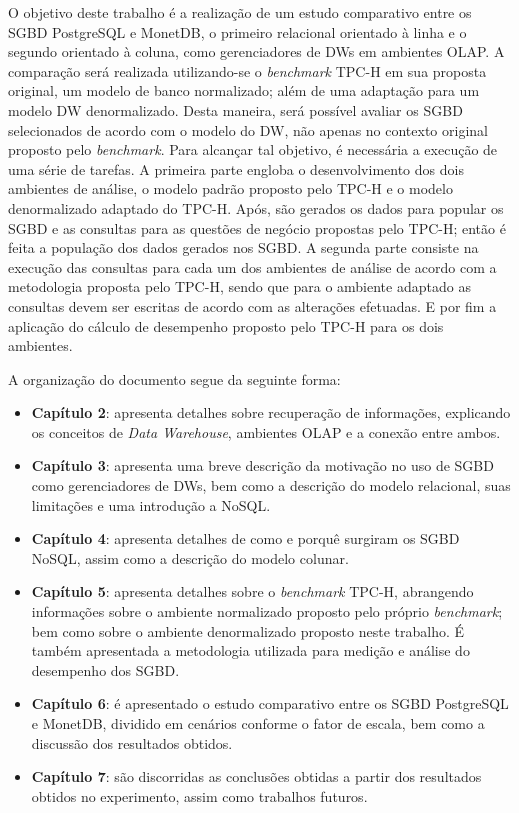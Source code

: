 O objetivo deste trabalho é a realização de um estudo comparativo entre os SGBD PostgreSQL e MonetDB, o primeiro relacional orientado à linha e o segundo orientado à coluna, 
como gerenciadores de DWs em ambientes OLAP. A comparação será realizada utilizando-se o \textit{benchmark} TPC-H em sua proposta original, um modelo de banco normalizado; 
além de uma adaptação para um modelo DW denormalizado. Desta maneira, será possível avaliar os SGBD selecionados de acordo com o modelo do DW, não apenas no 
contexto original proposto pelo \textit{benchmark}. Para alcançar tal objetivo, é necessária a execução de uma série de tarefas. A primeira parte engloba o 
desenvolvimento dos dois ambientes de análise, o modelo padrão proposto pelo TPC-H e o modelo denormalizado adaptado do TPC-H. Após, são gerados os 
dados para popular os SGBD e as consultas para as questões de negócio propostas pelo TPC-H; então é feita a população dos dados gerados nos SGBD. 
A segunda parte consiste na execução das consultas para cada um dos ambientes de análise de acordo com a metodologia proposta pelo TPC-H, sendo que para o ambiente adaptado as consultas devem 
ser escritas de acordo com as alterações efetuadas. E por fim a aplicação do cálculo de desempenho proposto pelo TPC-H para os dois ambientes. 

A organização do documento segue da seguinte forma:

\begin{itemize}
	\item \textbf{Capítulo 2}: apresenta detalhes sobre recuperação de informações, explicando os conceitos de \textit{Data Warehouse}, 
	ambientes OLAP e a conexão entre ambos.
	\item \textbf{Capítulo 3}: apresenta uma breve descrição da motivação no uso de SGBD como gerenciadores de DWs, bem como a descrição 
	do modelo relacional, suas limitações e uma introdução a NoSQL.
	\item \textbf{Capítulo 4}: apresenta detalhes de como e porquê surgiram os SGBD NoSQL, assim como a descrição do modelo colunar.
	\item \textbf{Capítulo 5}: apresenta detalhes sobre o \textit{benchmark} TPC-H, abrangendo informações sobre o ambiente normalizado proposto pelo próprio \textit{benchmark}; bem como sobre o ambiente denormalizado proposto neste trabalho. É também apresentada a metodologia utilizada para medição e análise do desempenho dos SGBD.
	\item \textbf{Capítulo 6}: é apresentado o estudo comparativo entre os SGBD PostgreSQL e MonetDB, dividido em cenários conforme o fator 
	de escala, bem como a discussão dos resultados obtidos.
	\item \textbf{Capítulo 7}: são discorridas as conclusões obtidas a partir dos resultados obtidos no experimento, assim como 
	trabalhos futuros.
\end{itemize}


